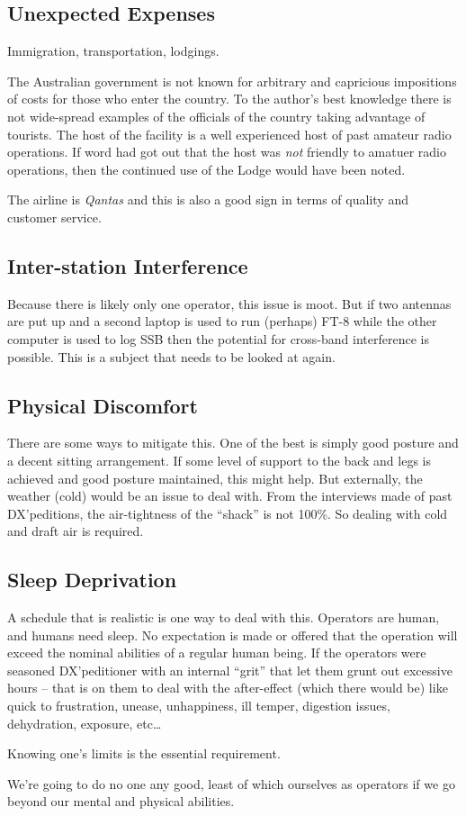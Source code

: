 \documentclass[11pt]{article}
\begin{document}
\subsection{Unexpected Expenses}

Immigration, transportation, lodgings.
\par

The Australian government is not known for arbitrary and capricious
impositions of costs for those who enter the country.  To the author's
best knowledge there is not wide-spread examples of the officials
of the country taking advantage of tourists.   The host of the facility
is a well experienced host of past amateur radio operations.  If word
had got out that the host was {\textit{not}} friendly to amatuer radio
operations, then the continued use of the Lodge would have been noted.
\par
The airline is {\textit{Qantas}} and this is also a good sign
in terms of quality and customer service.\par

\subsection{Inter-station Interference}

  Because there is likely only one
operator, this issue is moot.  But if two antennas are put up and a
second laptop is used to run (perhaps) FT-8 while the other computer
is used to log SSB then the potential for cross-band interference
is possible.  This is a subject that needs to be looked at again.

\subsection{Physical Discomfort} 
 There are some ways to mitigate this.
One of the best is simply good posture and a decent sitting
arrangement.  If some level of support to the back and legs
is achieved and good posture maintained, this might help.   But
externally, the weather (cold) would be an issue to deal with.  From
the interviews made of past DX'peditions, the air-tightness of the 
``shack'' is not 100\%.  So dealing with cold and draft air is required.

\subsection{Sleep Deprivation}
  A schedule that is realistic is one way
to deal with this.  Operators are human, and humans need sleep.  No
expectation is made or offered that the operation will exceed
the nominal abilities of a regular human being.  If the operators
were seasoned DX'peditioner with an internal ``grit'' that let them
grunt out excessive hours -- that is on them to deal with the after-effect
(which there would be) like quick to frustration, unease, unhappiness,
ill temper, digestion issues, dehydration, exposure, etc\ldots
\par
Knowing one's limits is the essential requirement.\par
We're going to do no one any good, least of which ourselves as
operators if we go beyond our mental and physical abilities.
\end{document}
